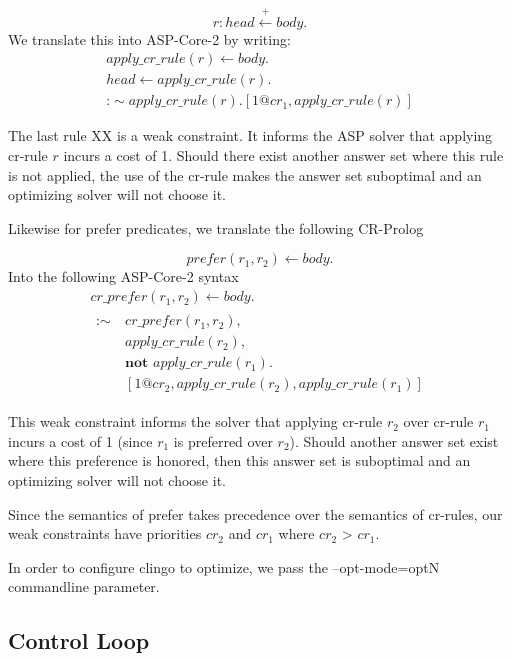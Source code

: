 \begin{equation}
    r: head \stackrel{+}\leftarrow body.
\end{equation}
We translate this into ASP-Core-2 by writing:
\begin{gather}
    apply\_cr\_rule(r) \leftarrow body. \\
    head \leftarrow apply\_cr\_rule(r). \\
    \text{:}\sim apply\_cr\_rule(r). [1@cr_1, apply\_cr\_rule(r)]
\end{gather}

The last rule XX is a weak constraint.
It informs the ASP solver that applying cr-rule $r$ incurs a cost of 1.
Should there exist another answer set where this rule is not applied, the use of the cr-rule makes the answer set suboptimal and an optimizing solver will not choose it.

Likewise for prefer predicates, we translate the following CR-Prolog

\begin{equation}
    prefer(r_1, r_2) \leftarrow body.
\end{equation}
Into the following ASP-Core-2 syntax
\begin{gather}
    cr\_prefer(r_1, r_2) \leftarrow body. \\
    \begin{split}
        \text{:}\sim \
            & cr\_prefer(r_1, r_2), \\
            & apply\_cr\_rule(r_2), \\
            & \textbf{not } apply\_cr\_rule(r_1). \\
            & [1@cr_2, apply\_cr\_rule(r_2), apply\_cr\_rule(r_1)]
    \end{split}
\end{gather}

This weak constraint informs the solver that applying cr-rule $r_2$ over cr-rule $r_1$ incurs a cost of 1 (since $r_1$ is preferred over $r_2$).
Should another answer set exist where this preference is honored, then this answer set is suboptimal and an optimizing solver will not choose it.

Since the semantics of prefer takes precedence over the semantics of cr-rules, our weak constraints have priorities $cr_2$ and $cr_1$ where $cr_2$ > $cr_1$.

In order to configure clingo to optimize, we pass the --opt-mode=optN commandline parameter.

\subsection{Control Loop}

